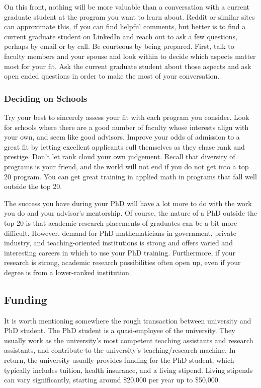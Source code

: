 \documentclass[11pt]{article}
\begin{document}
On this front, nothing will be more valuable than a conversation with a current graduate student at the program you want to learn about. Reddit or similar sites can approximate this, if you can find helpful comments, but better is to find a current graduate student on LinkedIn and reach out to ask a few questions, perhaps by email or by call. Be courteous by being prepared. First, talk to faculty members and your spouse and look within to decide which aspects matter most for your fit. Ask the current graduate student about those aspects and ask open ended questions in order to make the most of your conversation.

\subsubsection*{Deciding on Schools}
Try your best to sincerely assess your fit with each program you consider. Look for schools where there are a good number of faculty whose interests align with your own, and seem like good advisors. Improve your odds of admission to a great fit by letting excellent applicants cull themselves as they chase rank and prestige. Don't let rank cloud your own judgement. Recall that diversity of programs is your friend, and the world will not end if you do not get into a top 20 program. You can get great training in applied math in programs that fall well outside the top 20. 

The success you have during your PhD will have a lot more to do with the work you do and your advisor's mentorship. Of course, the nature of a PhD outside the top 20 is that academic research placements of graduates can be a bit more difficult. However, demand for PhD mathematicians in government, private industry, and teaching-oriented institutions is strong and offers varied and interesting careers in which to use your PhD training. Furthermore, if your research is strong, academic research possibilities often open up, even if your degree is from a lower-ranked institution.

\subsection{Funding}
It is worth mentioning somewhere the rough transaction between university and PhD student. The PhD student is a quasi-employee of the university. They usually work as the university's most competent teaching assistants and research assistants, and contribute to the university's teaching/research machine. In return, the university usually provides funding for the PhD student, which typically includes tuition, health insurance, and a living stipend. Living stipends can vary significantly, starting around \$20,000 per year up to \$50,000.
\end{document}
